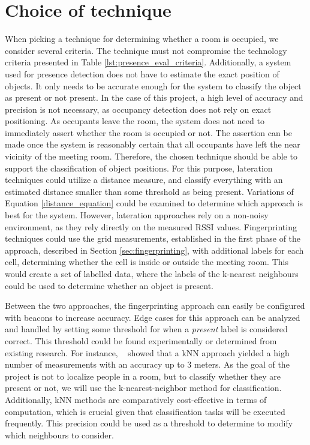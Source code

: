 \section{Choice of technique}\label{sec:ChoiceOfTechnique}
When picking a technique for determining whether a room is occupied, we consider several criteria.
The technique must not compromise the technology criteria presented in Table \ref{lst:presence_eval_criteria}.
Additionally, a system used for presence detection does not have to estimate the exact position of objects.
It only needs to be accurate enough for the system to classify the object as present or not present.
In the case of this project, a high level of accuracy and precision is not necessary, as occupancy detection does not rely on exact positioning.
As occupants leave the room, the system does not need to immediately assert whether the room is occupied or not.
The assertion can be made once the system is reasonably certain that all occupants have left the near vicinity of the meeting room.
Therefore, the chosen technique should be able to support the classification of object positions.  
For this purpose, lateration techniques could utilize a distance measure, and classify everything with an estimated distance smaller than some threshold as being present.
Variations of Equation \ref{distance_equation} could be examined to determine which approach is best for the system.
However, lateration approaches rely on a non-noisy environment, as they rely directly on the measured RSSI values.
Fingerprinting techniques could use the grid measurements, established in the first phase of the approach, described in Section \ref{sec:fingerprinting}, with additional labels for each cell, determining whether the cell is inside or outside the meeting room.
This would create a set of labelled data, where the labels of the k-nearest neighbours could be used to determine whether an object is present. 

Between the two approaches, the fingerprinting approach can easily be configured with beacons to increase accuracy.
Edge cases for this approach can be analyzed and handled by setting some threshold for when a \textit{present} label is considered correct. 
This threshold could be found experimentally or determined from existing research. 
For instance, \citeauthor{ble_kneares_neural}~\cite{ble_kneares_neural} showed that a kNN approach yielded a high number of measurements with an accuracy up to 3 meters.
As the goal of the project is not to localize people in a room, but to classify whether they are present or not, we will use the k-nearest-neighbor method for classification.
Additionally, kNN methods are comparatively cost-effective in terms of computation, which is crucial given that classification tasks will be executed frequently.
This precision could be used as a threshold to determine to modify which neighbours to consider.    
